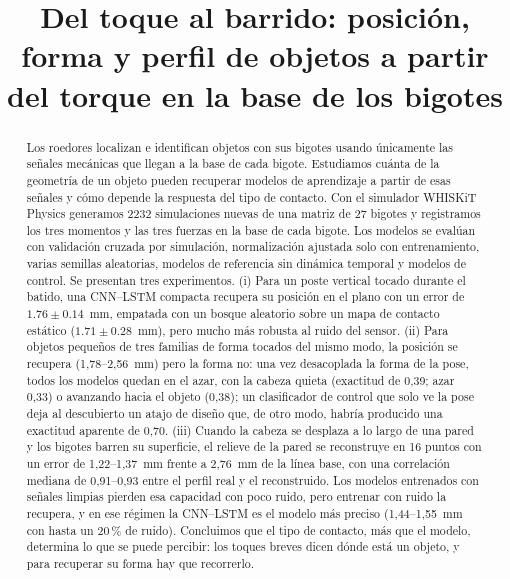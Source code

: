 \documentclass[conference]{IEEEtran}
\newcommand{\pmsd}[2]{$#1 \pm #2$}
\begin{document}
\title{Del toque al barrido: posición, forma y perfil de objetos a partir del torque en la base de los bigotes}

\author{
\and
{}
}

\maketitle

\begin{abstract}
Los roedores localizan e identifican objetos con sus bigotes usando únicamente las señales mecánicas que llegan a la base de cada bigote. Estudiamos cuánta de la geometría de un objeto pueden recuperar modelos de aprendizaje a partir de esas señales y cómo depende la respuesta del tipo de contacto. Con el simulador WHISKiT Physics generamos 2232 simulaciones nuevas de una matriz de 27 bigotes y registramos los tres momentos y las tres fuerzas en la base de cada bigote. Los modelos se evalúan con validación cruzada por simulación, normalización ajustada solo con entrenamiento, varias semillas aleatorias, modelos de referencia sin dinámica temporal y modelos de control. Se presentan tres experimentos. (i) Para un poste vertical tocado durante el batido, una CNN--LSTM compacta recupera su posición en el plano con un error de \pmsd{1.76}{0.14}~mm, empatada con un bosque aleatorio sobre un mapa de contacto estático (\pmsd{1.71}{0.28}~mm), pero mucho más robusta al ruido del sensor. (ii) Para objetos pequeños de tres familias de forma tocados del mismo modo, la posición se recupera (1,78--2,56~mm) pero la forma no: una vez desacoplada la forma de la pose, todos los modelos quedan en el azar, con la cabeza quieta (exactitud de 0,39; azar 0,33) o avanzando hacia el objeto (0,38); un clasificador de control que solo ve la pose deja al descubierto un atajo de diseño que, de otro modo, habría producido una exactitud aparente de 0,70. (iii) Cuando la cabeza se desplaza a lo largo de una pared y los bigotes barren su superficie, el relieve de la pared se reconstruye en 16 puntos con un error de 1,22--1,37~mm frente a 2,76~mm de la línea base, con una correlación mediana de 0,91--0,93 entre el perfil real y el reconstruido. Los modelos entrenados con señales limpias pierden esa capacidad con poco ruido, pero entrenar con ruido la recupera, y en ese régimen la CNN--LSTM es el modelo más preciso (1,44--1,55~mm con hasta un 20\,\% de ruido). Concluimos que el tipo de contacto, más que el modelo, determina lo que se puede percibir: los toques breves dicen dónde está un objeto, y para recuperar su forma hay que recorrerlo.
\end{abstract}
\end{document}
